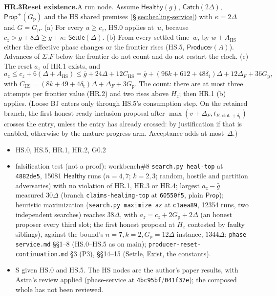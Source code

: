 \documentclass{article}
\newcommand{\slot}{\operatorname{slot}}
\newcommand{\dagnode}[6]{%
\par\medskip\noindent\textbf{#1\enspace #2.}\enspace #3
\begin{itemize}[leftmargin=2.2em,itemsep=0pt,topsep=2pt]
\item[\emph{Uses}] #4
\item[\emph{Evid.}] #5
\item[\emph{Task}] #6
\end{itemize}}
\begin{document}
\dagnode{HR.3}{Reset existence}{A run node.  Assume $\mathsf{Healthy}(g)$,
$\mathsf{Catch}(2\Delta)$, $\mathsf{Prop}^{+}(G_{\mathrm p})$ and the HS
shared premises (\S\ref{sec:healing-service}) with $\kappa=2\Delta$ and
$G=G_{\mathrm p}$.
(a) For every $u\geq c_z$, HS.0 applies at~$u$, because
$c_z>\bar g+8\Delta\geq\bar g+\kappa$: $\mathsf{Settle}(\Delta)$.
(b) From every settled time~$w$, by $w+A_{\mathrm{HS}}$ either the effective
phase changes or the frontier rises (HS.5, $\mathsf{Producer}(A)$).
Advances of $\Sigma.F$ below the frontier do not count and do not restart
the clock.
(c) The reset $a_z$ of HR.1 exists, and
\[
a_z\leq c_z+6(\Delta+A_{\mathrm{HS}})\leq\bar g+24\Delta+12C_{\mathrm{HS}}
=\bar g+(96k+612+48\delta_{\mathrm t})\Delta+12\Delta_F+36G_{\mathrm p},
\]
with $C_{\mathrm{HS}}=(8k+49+4\delta_{\mathrm t})\Delta+\Delta_F+3G_{\mathrm p}$.
The count: there are at most three attempts per frontier value (HR.2) and
two rises above $H_z$; then HR.1 (b) applies.
(Loose BJ enters only through HS.5's consumption step.  On the retained
branch, the first honest ready inclusion proposal after
$\max(v+\Delta_F,t_{E.\slot+\delta_{\mathrm t}})$ crosses the entry, unless
the entry has already crossed: by justification if that is enabled,
otherwise by the mature progress arm.  Acceptance adds at most~$\Delta$.)}
{HS.0, HS.5, HR.1, HR.2, G0.2}
{falsification test (not a proof): workbench\#8 \texttt{search.py heal-top} at
\texttt{4882de5}, 15081 $\mathsf{Healthy}$ runs ($n=4,7$; $k=2,3$; random,
hostile and partition adversaries) with no violation of HR.1, HR.3 or HR.4;
largest $a_z-\bar g$ measured $30\Delta$ (branch
\texttt{claims-healing-top} at \texttt{60550f5}, plain $\mathsf{Prop}$);
heuristic maximization (\texttt{search.py maximize az} at \texttt{c1aea89},
12354 runs, two independent searches) reaches $38\Delta$, with
$a_z=c_z+2G_{\mathrm p}+2\Delta$ (an honest proposer every third slot; the
first honest proposal at $H_z$ contested by faulty siblings), against the
bound's $n=7,k=2,G_{\mathrm p}=12\Delta$ instance, $1344\Delta$;
\texttt{phase-service.md} \S\S1--8 (HS.0--HS.5 as on main);
\texttt{producer-reset-continuation.md} \S3 (P3), \S\S14--15 (Settle, Exist,
the constants).}
{S given HS.0 and HS.5.  The HS nodes are the author's paper results, with
Astra's review applied (phase-service at \texttt{4bc95bf}/\texttt{041f37e});
the composed whole has not been reviewed.}
\end{document}
